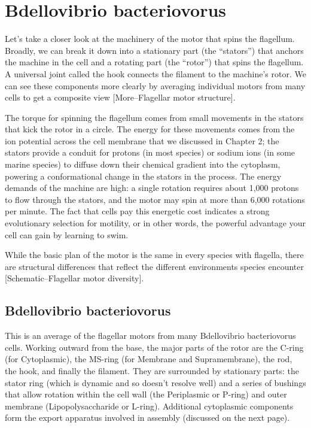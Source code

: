 \documentclass[]{tufte-book}
\begin{document}
\section{Bdellovibrio bacteriovorus}\label{bdellovibrio-bacteriovorus-1}

Let's take a closer look at the machinery of the motor that spins the
flagellum. Broadly, we can break it down into a stationary part (the
``stators'') that anchors the machine in the cell and a rotating part
(the ``rotor'') that spins the flagellum. A universal joint called the
hook connects the filament to the machine's rotor. We can see these
components more clearly by averaging individual motors from many cells
to get a composite view {[}More--Flagellar motor structure{]}.

The torque for spinning the flagellum comes from small movements in the
stators that kick the rotor in a circle. The energy for these movements
comes from the ion potential across the cell membrane that we discussed
in Chapter 2; the stators provide a conduit for protons (in most
species) or sodium ions (in some marine species) to diffuse down their
chemical gradient into the cytoplasm, powering a conformational change
in the stators in the process. The energy demands of the machine are
high: a single rotation requires about 1,000 protons to flow through the
stators, and the motor may spin at more than 6,000 rotations per minute.
The fact that cells pay this energetic cost indicates a strong
evolutionary selection for motility, or in other words, the powerful
advantage your cell can gain by learning to swim.

While the basic plan of the motor is the same in every species with
flagella, there are structural differences that reflect the different
environments species encounter {[}Schematic--Flagellar motor
diversity{]}.

\subsection{Bdellovibrio bacteriovorus}\label{Flagellar_motor_structure}

This is an average of the flagellar motors from many Bdellovibrio
bacteriovorus cells. Working outward from the base, the major parts of
the rotor are the C-ring (for Cytoplasmic), the MS-ring (for Membrane
and Supramembrane), the rod, the hook, and finally the filament. They
are surrounded by stationary parts: the stator ring (which is dynamic
and so doesn't resolve well) and a series of bushings that allow
rotation within the cell wall (the Periplasmic or P-ring) and outer
membrane (Lipopolysaccharide or L-ring). Additional cytoplasmic
components form the export apparatus involved in assembly (discussed on
the next page).
\end{document}
